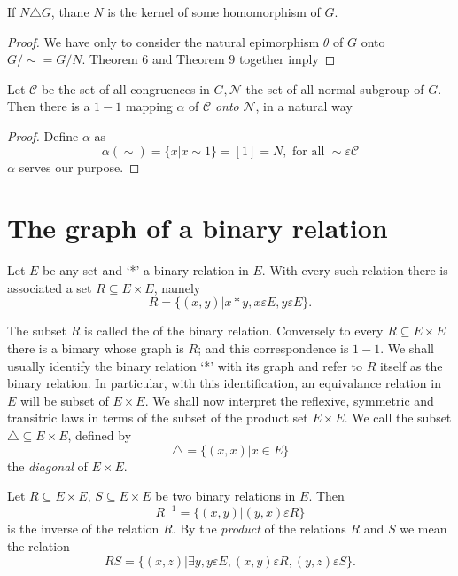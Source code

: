 \begin{corollary}
  If $N \triangle G$, thane $N$ is the kernel of some homomorphism of $G$. 
\end{corollary}

\begin{proof}
  We have only to consider the natural epimorphism $\theta$ of $G$
  onto $G/ \sim = G/N$. Theorem $6$ and Theorem $9$ together imply 
\end{proof}

\begin{Theorem} %
  Let $\mathscr{C}$ be the set of all congruences in $G, \mathscr{N}$
  the set of all normal subgroup of $G$. Then there is a $1-1$ mapping
  $\alpha$ of $\mathscr{C}$ {\em onto} $\mathscr{N}$, in a natural way 
\end{Theorem}

\begin{proof}
  Define $\alpha$ as
  $$
  \alpha (\sim) = \bigg\{ x \big| x \sim 1\bigg\} = [1] =N, \text{ for
    all } \sim \varepsilon \mathscr{C} 
  $$
  $\alpha$ serves our purpose.
\end{proof}

\section{The graph of a binary relation}%

Let $E$ be any set and `*' a binary relation in $E$. With every such
relation there is associated a set $R \subseteq E \times E$, namely 
$$
R = \bigg\{ (x,y) \big| x*y, x \varepsilon E, y \varepsilon E\bigg\}. 
$$

The subset $R$ is called the  of the binary
relation. Conversely to every $R \subseteq E \times E$ there is a
bimary whose graph is $R$; and this correspondence is $1-1$. We shall
usually identify the binary relation `*' with its graph and refer to
$R$ itself as the binary relation. In particular, with this
identification, an equivalance relation in $E$ will be subset of $E
\times E$. We shall now interpret the reflexive, symmetric and
transitric laws in terms of the subset of the product set $E \times
E$. We call the subset $\triangle \subseteq E \times E$, defined by     
$$
\triangle = \bigg\{ (x,x)\big | x \in E\bigg\}
$$
the \textit{ diagonal } of $E \times E$.

Let $R \subseteq E \times E$, $S \subseteq E \times E$ be two binary
relations in $E$. Then 
$$
R^{-1} = \bigg\{ (x,y) \bigg| (y,x) \varepsilon R\bigg\}
$$
is the inverse of the relation $R$. By the \textit{product} of the
relations $R$ and $S$ we mean the relation 
$$
RS = \bigg\{ (x,z) \big| \exists y,y \varepsilon E, (x,y) \varepsilon
R, (y,z) \varepsilon S\bigg\}. 
$$

